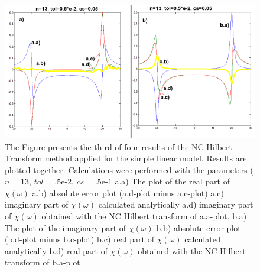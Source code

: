 \documentclass[12pt,twoside,a4paper]{article}
\numberwithin{equation}{subsection}
\numberwithin{figure}{subsection}
\begin{document}
\begin{figure}
  \includegraphics[width=150mm]{img/nc_lin3.png}
  \caption{ The Figure presents the third of four results of the NC Hilbert Transform method applied for the simple linear model. Results
   are plotted together. Calculations were performed with the parameters ($n=13, \,tol=\mbox{.5e-2}, \,cs=\mbox{.5e-1}$
    a.a) The plot of the real part of $\chi (\omega )$
    a.b) absolute error plot (a.d-plot minus a.c-plot) 
    a.c) imaginary part of $\chi (\omega )$ calculated analytically 
    a.d) imaginary part of $\chi (\omega )$ obtained with the NC Hilbert transform of a.a-plot, 
    b.a) The plot of the imaginary part of $\chi (\omega )$
    b.b) absolute error plot (b.d-plot minus b.c-plot) 
    b.c) real part of $\chi (\omega )$ calculated analytically 
    b.d) real part of $\chi (\omega )$ obtained with the NC Hilbert transform of b.a-plot
    \label{fig:nc_lin3}     
  }
\end{figure}
\end{document}
